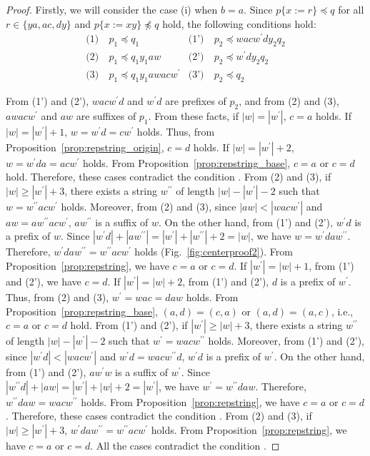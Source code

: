 \begin{proof}
Firstly, we will consider the case (i) when $b = a$.
Since $p \{ x := r \} \preceq q$ for all $r \in \{ ya, ac, dy \}$ and $p \{ x := xy \} \not \preceq q$ hold, the following conditions hold:
\begin{align*}
  \textrm{(1)}~& p_{1} \preceq q_{1} & \textrm{(1')}~& p_{2} \preceq wacw^{\prime}dy_{2}q_{2} \\
  \textrm{(2)}~& p_{1} \preceq q_{1}y_{1}aw & \textrm{(2')}~& p_{2} \preceq w^{\prime}dy_{2}q_{2} \\
  \textrm{(3)}~& p_{1} \preceq q_{1}y_{1}awacw^{\prime} & \textrm{(3')}~& p_{2} \preceq q_{2}
\end{align*}

From (1') and (2'), $wacw^{\prime}d$ and $w^{\prime}d$ are prefixes of $p_{2}$, and from (2) and (3), $awacw^{\prime}$ and $aw$ are suffixes of $p_{1}$.
  From these facts, if $|w|=|w^{\prime}|$, $c = a$ holds.
  If $|w|=|w^{\prime}|+1$, $w = w^{\prime}d = cw^{\prime}$ holds. Thus, from Proposition~\ref{prop:repstring_origin}, $c = d$ holds.
  If $|w| = |w^{\prime}|+2$, $w = w^{\prime}da = acw^{\prime}$ holds.
  From Proposition~\ref{prop:repstring_base}, $c = a$ or $c = d$ hold.
  Therefore, these cases contradict the condition \TheConditionBsub.
  From (2) and (3), if $|w| \ge |w^{\prime}|+3$, there exists a string $w^{\prime\prime}$ of length $|w|-|w^{\prime}|-2$ such that $w=w^{\prime\prime}acw^{\prime}$ holds.
  Moreover, from (2) and (3), since $|aw| < |wacw^{\prime}|$ and $aw = aw^{\prime\prime}acw^{\prime}$, $aw^{\prime\prime}$ is a suffix of $w$.
  On the other hand, from (1') and (2'), $w^{\prime}d$ is a prefix of $w$.
  Since $|w^{\prime}d| + |aw^{\prime\prime}| = |w^{\prime}| + |w^{\prime\prime}| + 2 = |w|$, we have $w=w^{\prime}daw^{\prime\prime}$.
  Therefore, $w^{\prime}daw^{\prime\prime} = w^{\prime\prime}acw^{\prime}$ holds (Fig.~\ref{fig:centerproof2}).
  From Proposition~\ref{prop:repstring}, we have $c = a$ or $c = d$.
  If $|w^{\prime}|=|w|+1$, from (1') and (2'), we have $c = d$.
  If $|w^{\prime}| = |w|+2$, from (1') and (2'), $d$ is a prefix of $w^{\prime}$. Thus, from (2) and (3), $w^{\prime} = wac = daw$ holds. From Proposition~\ref{prop:repstring_base}, $(a, d) = (c, a)$ or $(a, d) = (a, c)$, i.e., $c = a$ or $c = d$ hold.
  From (1') and (2'), if $|w^{\prime}| \ge |w|+3$, there exists a string $w^{\prime\prime}$ of length $|w|-|w^{\prime}|-2$ such that $w^{\prime}=wacw^{\prime\prime}$ holds.
  Moreover, from (1') and (2'), since $|w^{\prime}d| < |wacw^{\prime}|$ and $w^{\prime}d = wacw^{\prime\prime}d$, $w^{\prime}d$ is a prefix of $w^{\prime}$.
  On the other hand, from (1') and (2'), $aw^{\prime}w$ is a suffix of $w^{\prime}$.
  Since $|w^{\prime\prime}d| + |aw| = |w^{\prime}| + |w| + 2 = |w^{\prime}|$, we have $w^{\prime}=w^{\prime\prime}daw$.
  Therefore, $w^{\prime\prime}daw = wacw^{\prime\prime}$ holds.
  From Proposition~\ref{prop:repstring}, we have $c = a$ or $c = d$.
  Therefore, these cases contradict the condition \TheConditionBsub.
  From (2) and (3), if $|w| \ge |w^{\prime}|+3$, $w^{\prime}daw^{\prime\prime} = w^{\prime\prime}acw^{\prime}$ holds.
  From Proposition~\ref{prop:repstring}, we have $c = a$ or $c = d$.
  All the cases contradict the condition \TheConditionBsub.


\end{proof}
